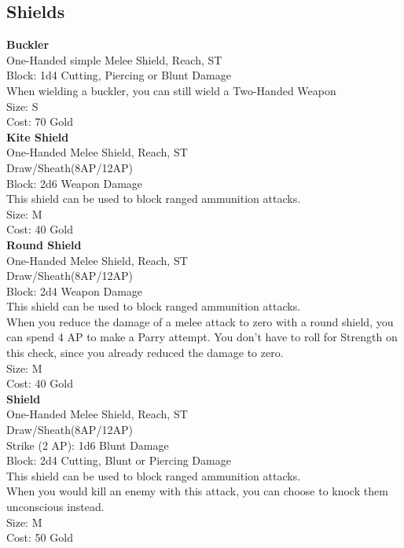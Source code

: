 \subsection{Shields}\label{subsec:shields}
\textbf{Buckler}\label{weapon:buckler}\\
One-Handed simple Melee Shield,  Reach, ST\\
Block: 1d4 Cutting, Piercing or Blunt Damage\\
When wielding a buckler, you can still wield a Two-Handed Weapon\\
Size: S\\
Cost: 70 Gold\\

\textbf{Kite Shield}\label{weapon:kiteShield}\\
One-Handed Melee Shield,  Reach, ST\\
Draw/Sheath(8AP/12AP)\\
Block: 2d6 Weapon Damage\\
This shield can be used to block ranged ammunition attacks.\\
Size: M\\
Cost: 40 Gold\\

\textbf{Round Shield}\label{weapon:roundShield}\\
One-Handed Melee Shield,  Reach, ST\\
Draw/Sheath(8AP/12AP)\\
Block: 2d4 Weapon Damage\\
This shield can be used to block ranged ammunition attacks.\\
When you reduce the damage of a melee attack to zero with a round shield, you can spend 4 AP to make a Parry attempt.
You don't have to roll for Strength on this check, since you already reduced the damage to zero.\\
Size: M\\
Cost: 40 Gold\\

\textbf{Shield}\label{weapon:shield}\\
One-Handed Melee Shield,  Reach, ST\\
Draw/Sheath(8AP/12AP)\\
Strike (2 AP): 1d6 Blunt Damage\\
Block: 2d4 Cutting, Blunt or Piercing Damage\\
This shield can be used to block ranged ammunition attacks.\\
When you would kill an enemy with this attack, you can choose to knock them unconscious instead.\\
Size: M\\
Cost: 50 Gold\\

